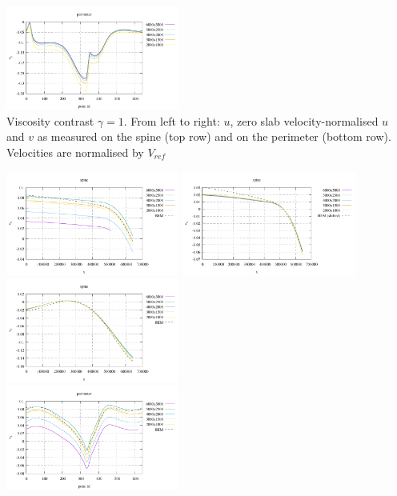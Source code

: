 \begin{center}
\includegraphics[width=5.7cm]{python_codes/fieldstone_55/gamma001/vy_perimeter}\\
{\captionfont Viscosity contrast $\gamma=1$. From left to right: $u$, zero slab velocity-normalised $u$ 
and $v$ as measured on the spine (top row) and on the perimeter (bottom row). Velocities are normalised by $V_{ref}$}
\end{center}


\begin{center}
\includegraphics[width=5.7cm]{python_codes/fieldstone_55/gamma100/vx_spine}
\includegraphics[width=5.7cm]{python_codes/fieldstone_55/gamma100/vx_spine2}
\includegraphics[width=5.7cm]{python_codes/fieldstone_55/gamma100/vy_spine}\\
\includegraphics[width=5.7cm]{python_codes/fieldstone_55/gamma100/vx_perimeter}

\end{center}

